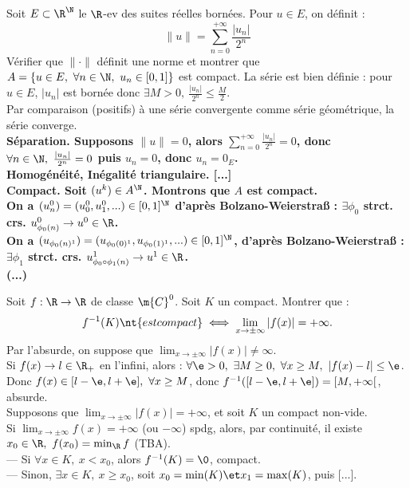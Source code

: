 \documentclass[11pt]{article}
\begin{document}
\begin{exercice}{}{}
    Soit $E\subset\R^\N$ le $\R$-ev des suites réelles bornées. Pour $u\in E$, on définit :
    \begin{equation*}
        \|u\|=\sum_{n=0}^{+\infty}\frac{|u_n|}{2^n}
    \end{equation*}
    Vérifier que $\|\cdot\|$ définit une norme et montrer que $A=\{u\in E, ~ \forall n \in \N, ~ u_n \in [0,1]\}$ est compact.
    \tcblower
    La série est bien définie : pour $u\in E$, $|u_n|$ est bornée donc $\exists M > 0, ~ \frac{|u_n|}{2^n}\leq\frac{M}{2}$.\\
    Par comparaison (positifs) à une série convergente comme série géométrique, la série converge.\\
    \bf{Séparation.} Supposons $\|u\|=0$, alors $\sum_{n=0}^{+\infty}\frac{|u_n|}{2^n}=0$, donc $\forall n \in \N, ~ \frac{|u_n|}{2^n}=0$ puis $u_n=0$, donc $u_n=0_E$.\\
    \bf{Homogénéité, Inégalité triangulaire.} [...]\\
    \bf{Compact.} Soit $(u^k)\in A^\N$. Montrons que $A$ est compact.\\
    On a $(u_n^0)=(u_0^0,u_1^0,...)\in[0,1]^\N$ d'après Bolzano-Weierstraß : $\exists \phi_0$ strct. crs. $u^0_{\phi_0(n)}\to u^0\in\R$.\\
    On a $(u_{\phi_0(n)^1})=(u_{\phi_0(0)^1}, u_{\phi_0(1)^1}, ...)\in [0,1]^\N$, d'après Bolzano-Weierstraß : $\exists \phi_1$ strct. crs. $u_{\phi_0\circ\phi_1(n)}^1\to u^1\in\R$.\\
    (...) 
\end{exercice}

\pagebreak

\begin{exercice}{}{}
    Soit $f:\R\to\R$ de classe $\m{C}^0$. Soit $K$ un compact. Montrer que :
    \begin{equation*}
        f^{-1}(K) \nt{ est compact} \iff \lim_{x\to\pm\infty}|f(x)|=+\infty.
    \end{equation*}
    \tcblower
    \boxed{\ra} Par l'absurde, on suppose que $\lim_{x\to\pm\infty}|f(x)|\neq \infty$.\\
    Si $f(x)\to l \in \R_+$ en l'infini, alors : $\forall \e>0, ~ \exists M \geq 0, ~ \forall x \geq M, ~ |f(x)-l|\leq \e$.\\
    Donc $f(x)\in[l-\e,l+\e], ~ \forall x \geq M$, donc $f^{-1}([l-\e,l+\e])=[M,+\infty[$, absurde.\\
    \boxed{\la} Supposons que $\lim_{x\to\pm\infty}|f(x)|=+\infty$, et soit $K$ un compact non-vide.\\
    Si $\lim_{x\to\pm\infty}f(x)=+\infty$ (ou $-\infty$) spdg, alors, par continuité, il existe $x_0\in\R, ~ f(x_0)=\min_\R f$ (TBA).\\
    --- Si $\forall x \in K, ~ x < x_0$, alors $f^{-1}(K)=\0$, compact.\\
    --- Sinon, $\exists x \in K, ~ x \geq x_0$, soit $x_0=\min(K)\et x_1=\max(K)$, puis [...]. 
\end{exercice}
\end{document}
